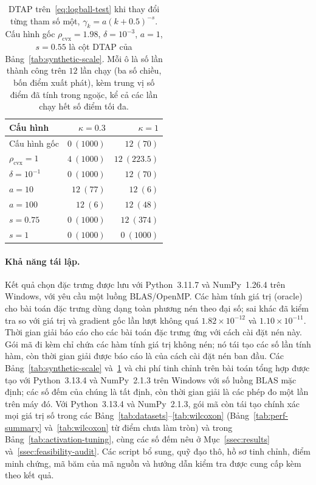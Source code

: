 \documentclass[]{interact}
\theoremstyle{plain}
\theoremstyle{definition}
\theoremstyle{remark}
\newcommand{\cvx}{\mathrm{cvx}}
\begin{document}
\begin{table}[t]
\centering\small
\setlength{\tabcolsep}{5pt}
\caption{DTAP trên~\eqref{eq:logball-test} khi thay đổi từng tham số một,
$\gamma_k=a(k+0.5)^{-s}$. Cấu hình gốc $\rho_{\cvx}=1.98$, $\delta=10^{-3}$, $a=1$,
$s=0.55$ là cột DTAP của Bảng~\ref{tab:synthetic-scale}. Mỗi ô là
số lần thành công trên $12$ lần chạy (ba số chiều, bốn điểm xuất phát), kèm
trung vị số điểm đã tính trong ngoặc, kể cả các lần chạy hết số điểm tối đa.}
\label{tab:dtap-sweep}
\begin{tabular}{@{}lrr@{}}
\toprule
Cấu hình & $\kappa=0.3$ & $\kappa=1$\\
\midrule
Cấu hình gốc & $0\ (1000)$ & $12\ (70)$\\
$\rho_{\cvx}=1$ & $4\ (1000)$ & $12\ (223.5)$\\
$\delta=10^{-1}$ & $0\ (1000)$ & $12\ (70)$\\
$a=10$ & $12\ (77)$ & $12\ (6)$\\
$a=100$ & $12\ (6)$ & $12\ (48)$\\
$s=0.75$ & $0\ (1000)$ & $12\ (374)$\\
$s=1$ & $0\ (1000)$ & $0\ (1000)$\\
\bottomrule
\end{tabular}
\end{table}

\paragraph*{Khả năng tái lập.}
Kết quả chọn đặc trưng được lưu với Python~3.11.7 và NumPy~1.26.4
trên Windows, với yêu cầu một luồng BLAS/OpenMP. Các hàm tính giá trị (oracle) cho bài toán đặc trưng dùng dạng toàn phương
nén theo đại số; sai khác đã kiểm tra so với giá trị và gradient
gốc lần lượt không quá $1.82\times10^{-12}$ và
$1.10\times10^{-11}$. Thời gian giải báo cáo cho các bài toán đặc trưng ứng
với cách cài đặt nén này. Gói mã đi kèm chỉ chứa các hàm tính giá trị không nén;
nó tái tạo các số lần tính hàm, còn thời gian giải được báo cáo là của
cách cài đặt nén ban đầu. Các Bảng~\ref{tab:synthetic-scale}
và~\ref{tab:dtap-sweep} và chi phí tinh chỉnh trên bài toán tổng hợp được tạo với
Python~3.13.4 và NumPy~2.1.3 trên Windows với số luồng BLAS
mặc định; các số đếm của chúng là tất định, còn thời gian giải là các
phép đo một lần trên máy đó. Với Python~3.13.4 và NumPy~2.1.3, gói mã còn
tái tạo chính xác mọi giá trị số trong các Bảng~\ref{tab:datasets}--\ref{tab:wilcoxon}
(Bảng~\ref{tab:perf-summary} và~\ref{tab:wilcoxon} từ điểm chưa làm tròn) và trong
Bảng~\ref{tab:activation-tuning}, cùng các số đếm nêu ở Mục~\ref{ssec:results}
và~\ref{ssec:feasibility-audit}.
Các script bổ sung, quỹ đạo thô, hồ sơ tinh chỉnh, điểm minh chứng,
mã băm của mã nguồn và hướng dẫn kiểm tra được cung cấp kèm theo kết quả.
\end{document}
